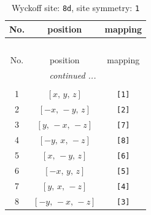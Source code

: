 \documentclass[fleqn,8pt]{jsarticle}
\begin{document}
\begin{longtable}{ccc}
\caption{Wyckoff site: {\tt 8d}, site symmetry: {\tt 1}}
 \\
 \hline \hline
No. & position & mapping \\ \hline \endfirsthead

\multicolumn{2}{l}{\tablename\ \thetable{}} \\
 \hline \hline
No. & position & mapping \\ \hline \endhead

 \hline \hline
\multicolumn{2}{r}{\footnotesize\it continued ...} \\ \endfoot

 \hline \hline
\multicolumn{2}{r}{} \\ \endlastfoot

1 & $\left[ x,\, y,\, z \right]$ & {\tt [1]} \\ \hline
2 & $\left[ - x,\, - y,\, z \right]$ & {\tt [2]} \\ \hline
3 & $\left[ y,\, - x,\, - z \right]$ & {\tt [7]} \\ \hline
4 & $\left[ - y,\, x,\, - z \right]$ & {\tt [8]} \\ \hline
5 & $\left[ x,\, - y,\, z \right]$ & {\tt [6]} \\ \hline
6 & $\left[ - x,\, y,\, z \right]$ & {\tt [5]} \\ \hline
7 & $\left[ y,\, x,\, - z \right]$ & {\tt [4]} \\ \hline
8 & $\left[ - y,\, - x,\, - z \right]$ & {\tt [3]} \\
\end{longtable}
\end{document}

